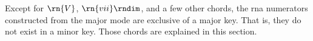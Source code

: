 
Except for $\rn{V}$, $\rn{vii}\rndim$, and a few other
chords, the \gls{rna} numerators constructed from the major
mode are exclusive of a major key. That is, they do not
exist in a minor key. Those chords are explained in this
section.
